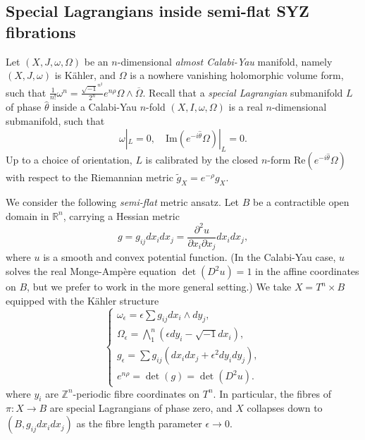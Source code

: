 \documentclass{article}
\theoremstyle{definition}
\newcommand{\R}{\mathbb{R}}
\newcommand{\Z}{\mathbb{Z}}
\begin{document}
		
		
		
		
		
		
		\subsection{Special Lagrangians inside semi-flat SYZ fibrations}
		
		
		
		Let $(X, J,\omega, \Omega)$ be an $n$-dimensional \emph{almost Calabi-Yau} manifold, namely $(X, J, \omega)$ is K\"ahler, and $\Omega$ is a nowhere vanishing holomorphic volume form, such that $\frac{1}{n!} \omega^n=  \frac{\sqrt{-1}^{n^2}} {2^n}e^{n\rho} \Omega \wedge \overline{\Omega}$. Recall that a \emph{special Lagrangian} submanifold $L$ of phase $\hat{\theta}$ inside a Calabi-Yau $n$-fold $(X, I, \omega, \Omega)$ is a real $n$-dimensional submanifold, such that
		\[
		\omega|_L=0,\quad \text{Im}(e^{-i\hat{\theta}}\Omega)|_L=0.
		\]
		Up to a choice of orientation, $L$ is calibrated by the closed $n$-form $\text{Re}(  e^{-i\hat{\theta}}\Omega ) $ with respect to the Riemannian metric $\tilde{g}_X= e^{-\rho} g_X$. 
		
		
		
		
		
		We consider the following \emph{semi-flat} metric ansatz. Let $B$ be a contractible open domain in $\R^n$,  carrying a Hessian metric
		\begin{equation}
		g= g_{ij} dx_i dx_j= \frac{\partial^2 u}{\partial x_i\partial x_j} dx_idx_j,
		\end{equation}
		where $u$ is a smooth and convex potential function. (In the Calabi-Yau case, $u$ solves the real Monge-Amp\`ere equation $\det(D^2 u)=1$ in the affine coordinates on $B$, but we prefer to work in the more general setting.)  
		We take $X= T^n\times B$  equipped with the K\"ahler structure
		\begin{equation}
		\begin{cases}
				\omega_\epsilon= \epsilon \sum g_{ij} dx_i \wedge dy_j,
				\\
				\Omega_\epsilon= \bigwedge_1^n (\epsilon dy_i- \sqrt{-1}  dx_i),
				\\
				 g_\epsilon=\sum g_{ij}(dx_idx_j+\epsilon^2 dy_i dy_j),
				 \\
				 e^{n\rho}= \det(g)= \det(D^2 u).
		\end{cases}
		\end{equation}
		where %
		$y_i$ are $\Z^n$-periodic fibre coordinates on $T^n$. In particular, the fibres of $\pi: X\to B$ are special Lagrangians of phase zero, and $X$ collapses down to $(B, g_{ij}dx_idx_j) $ as the fibre length parameter $\epsilon\to 0$. 
		
\end{document}
